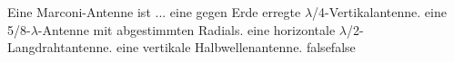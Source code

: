     {Eine Marconi-Antenne ist ...}
    {eine gegen Erde erregte $\lambda$/4-Vertikalantenne.}
    {eine 5/8-$\lambda$-Antenne mit abgestimmten Radials.}
    {eine horizontale $\lambda$/2-Langdrahtantenne.}
    {eine vertikale Halbwellenantenne.}
    {false}{false}